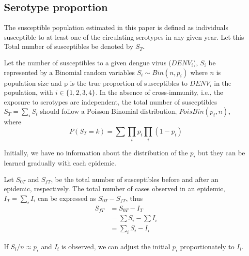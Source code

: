 \subsection*{Serotype proportion}
The susceptible population estimated in this paper is defined as individuals 
susceptible to at least one of the circulating serotypes in any given year. 
Let this Total number of susceptibles be denoted by $S_T$. 

Let the number of susceptibles to a given dengue virus ($DENV_i$), $S_i$ be 
represented by a Binomial random variables $S_i \sim Bin(n, p_i)$ where $n$ is 
population size and p is the true proportion of susceptibles to $DENV_i$ in 
the population, with $i \in  \{1, 2, 3, 4\}$. In the absence of 
cross-immunity, i.e., the exposure to serotypes are independent, the 
total number of susceptibles $S_T=\sum_i S_i$  should follow a Poisson-Binomial 
distribution, $PoisBin(p_i,n)$, where
\begin{equation}
 P(S_T=k) = \sum \prod_i p_i \prod_i  (1-p_i)
\end{equation}

Initially, we have no information about the distribution of the $p_i$ but they 
can be learned gradually with each epidemic.

Let $S_{0T}$ and $S_{fT}$, be the total number of susceptibles before and 
after an epidemic, respectively. The total number of cases observed in an 
epidemic, $I_T = \sum_i I_i$ can be expressed as $S_{0T}-S_{fT}$, thus
\begin{align}
 S_{fT} &= S_{0T} - I_T\\
 &=\sum S_i - \sum I_i\\
 &=\sum_i S_i-I_i
\end{align}

If $S_i/n \approx p_i$ and $I_i$ is observed, we can adjust the initial 
$p_i$ proportionately to $I_i$.








